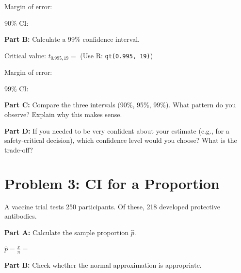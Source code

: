 \documentclass[11pt]{article}
\begin{document}
\vspace{0.5cm}

Margin of error:

\vspace{2cm}

90\% CI:

\vspace{2cm}

\textbf{Part B:} Calculate a 99\% confidence interval.

\vspace{0.3cm}

Critical value: $t_{0.995, 19} = $ \hspace{1cm} (Use R: \texttt{qt(0.995, 19)})

\vspace{0.5cm}

Margin of error:

\vspace{2cm}

99\% CI:

\vspace{2cm}

\textbf{Part C:} Compare the three intervals (90\%, 95\%, 99\%). What pattern do you observe? Explain why this makes sense.

\vspace{3cm}

\textbf{Part D:} If you needed to be very confident about your estimate (e.g., for a safety-critical decision), which confidence level would you choose? What is the trade-off?

\vspace{3cm}

\newpage

\section{Problem 3: CI for a Proportion}

A vaccine trial tests 250 participants. Of these, 218 developed protective antibodies.

\vspace{6pt}

\textbf{Part A:} Calculate the sample proportion $\hat{p}$.

\vspace{0.3cm}

$\hat{p} = \frac{x}{n} = $

\vspace{1.5cm}

\textbf{Part B:} Check whether the normal approximation is appropriate.
\end{document}
